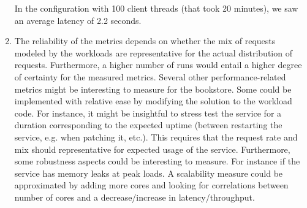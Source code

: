 \documentclass[11pt,a4paper,english]{article}
\begin{document}
\begin{enumerate}
In the configuration with 100 client threads (that took 20 minutes), we saw an average
latency of 2.2 seconds.

\item The reliability of the metrics depends on whether the mix of requests modeled by the workloads are representative for the actual distribution of requests. Furthermore, a higher number of runs would entail a higher degree of certainty for the measured metrics. Several other performance-related metrics might be interesting to measure for the bookstore. Some could be implemented with relative ease by modifying the solution to the workload code. For instance, it might be insightful to stress test the service for a duration corresponding to the expected uptime (between restarting the service, e.g. when patching it, etc.). This requires that the request rate and mix should representative for expected usage of the service. Furthermore, some robustness aspects could be interesting to measure. For instance if the service has memory leaks at peak loads. A scalability measure could be approximated by adding more cores and looking for correlations between number of cores and a decrease/increase in latency/throughput.
\end{enumerate}
\end{document}
